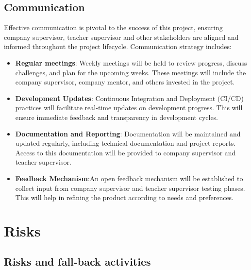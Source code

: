 \documentclass[a4paper, 11pt]{article}
\begin{document}
  \subsection{Communication} 
  Effective communication is pivotal to the success of this project, ensuring company supervisor, teacher supervisor and other stakeholders are aligned and informed throughout the project lifecycle. Communication strategy includes:
  \begin{itemize}
    \item \textbf{Regular meetings}: Weekly meetings will be held to review progress, discuss challenges, and plan for the upcoming weeks. These meetings will include the company supervisor, company mentor, and others invested in the project.
    \item\textbf{Development Updates}: Continuous Integration and Deployment (CI/CD) practices will facilitate real-time updates on development progress. This will ensure immediate feedback and transparency in development cycles.
    \item \textbf{Documentation and Reporting}: Documentation will be maintained and updated regularly, including technical documentation and project reports. Access to this documentation will be provided to company supervisor and teacher supervisor.
    \item  \textbf{Feedback Mechanism}:An open feedback mechanism will be established to collect input from company supervisor and teacher supervisor testing phases. This will help in refining the product according to needs and preferences.
  \end{itemize}


\pagebreak
\section{Risks}
\subsection{Risks and fall-back activities}
\end{document}
